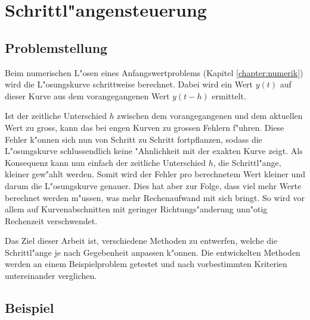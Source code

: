 \chapter{Schrittl"angensteuerung\label{chapter:schrittlaenge}}
\begin{refsection}

\section{Problemstellung}

Beim numerischen L"osen eines Anfangswertproblems (Kapitel \ref{chapter:numerik}) wird die L"osungskurve schrittweise berechnet.
Dabei wird ein Wert $y(t)$ auf dieser Kurve aus dem vorangegangenen Wert $y(t-h)$ ermittelt.  

Ist der zeitliche Unterschied $h$ zwischen dem vorangegangenen und dem aktuellen Wert zu gross, kann das bei engen Kurven zu grossen Fehlern f"uhren.
Diese Fehler k"onnen sich nun von Schritt zu Schritt fortpflanzen, sodass die L"osungskurve schlussendlich keine "Ahnlichkeit mit der exakten Kurve zeigt.
Als Konsequenz kann nun einfach der zeitliche Unterschied $h$, die Schrittl"ange, kleiner gew"ahlt werden.
Somit wird der Fehler pro berechnetem Wert kleiner und darum die L"osungskurve genauer.
Dies hat aber zur Folge, dass viel mehr Werte berechnet werden m"ussen, was mehr Rechenaufwand mit sich bringt.
So wird vor allem auf Kurvenabschnitten mit geringer Richtungs"anderung unn"otig Rechenzeit verschwendet.

Das Ziel dieser Arbeit ist, verschiedene Methoden zu entwerfen, welche die Schrittl"ange je nach Gegebenheit anpassen k"onnen. 
Die entwickelten Methoden werden an einem Beispielproblem getestet und nach vorbestimmten Kriterien untereinander verglichen.

\section{Beispiel}


\end{refsection}

